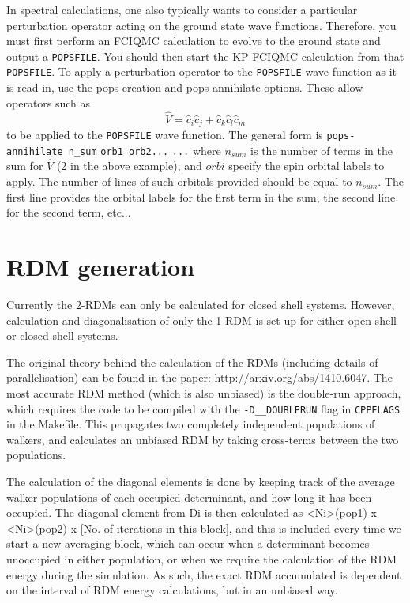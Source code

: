 \documentclass[a4paper,notitlepage]{scrreprt}
\let\code\lstinline
\begin{document}
    In spectral calculations, one also typically wants to consider a particular
    perturbation operator acting on the ground state wave functions. Therefore,
    you must first perform an FCIQMC calculation to evolve to the ground state
    and output a \code{POPSFILE}. You should then start the KP-FCIQMC
    calculation from that \code{POPSFILE}. To apply a perturbation operator to
    the \code{POPSFILE} wave function as it is read in, use the pops-creation
    and pops-annihilate options. These allow operators such as
    \begin{equation}
        \hat{V} = \hat{c}_i \hat{c}_j + \hat{c}_k \hat{c}_l \hat{c}_m
    \end{equation}
    to be applied to the \code{POPSFILE} wave function. The general form is
    \code{pops-annihilate n_sum}
    \code{orb1 orb2...}
    \code{...}
    where $n_{sum}$ is the number of terms in the sum for $\hat{V}$ (2 in the
    above example), and $orbi$ specify the spin orbital labels to apply. The
    number of lines of such orbitals provided should be equal to $n_{sum}$. The
    first line provides the orbital labels for the first term in the sum, the
    second line for the second term, etc...

\section{RDM generation}

Currently the 2-RDMs can only be calculated for closed shell systems.  However, calculation and
diagonalisation of only the 1-RDM is set up for either open shell or closed shell systems.

The original theory behind the calculation of the RDMs (including details of parallelisation) can be found in the paper:
\url{http://arxiv.org/abs/1410.6047}. The most accurate RDM method (which is also unbiased) is the double-run approach, which requires
the code to be compiled with the \code{-D__DOUBLERUN} flag in \code{CPPFLAGS} in the Makefile. This propagates
two completely independent populations of walkers, and calculates an unbiased RDM by taking cross-terms
between the two populations.

The calculation of the diagonal elements is done by keeping track of the average walker populations of each
occupied determinant, and how long it has been occupied.  The diagonal element from Di is then calculated
as <Ni>(pop1) x <Ni>(pop2) x [No. of iterations in this block], and this is included every time we start a new
averaging block, which can occur when a determinant becomes unoccupied in either population, or when we require
the calculation of the RDM energy during the simulation. As such, the exact RDM accumulated is dependent on
the interval of RDM energy calculations, but in an unbiased way.
\end{document}
